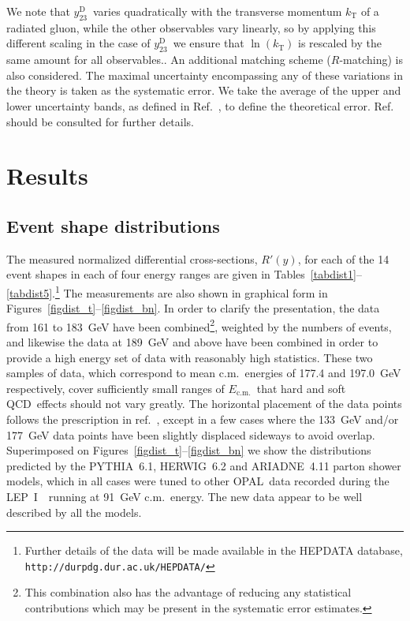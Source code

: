 \documentclass[12pt,a4paper,twoside]{article}
\newcommand{\ecm}   {\ensuremath{E_{\mathrm{c.m.}}}}
\newcommand{\ytwothree}   {\ensuremath{y^{\mathrm{D}}_{23}}}
\newcommand{\Opal}{\mbox{\rm OPAL}}
\newcommand{\qcd}{\mbox{QCD}}
\newcommand{\Lepone}{\mbox{LEP I }}
\newcommand{\Herwig}{\mbox{HERWIG}}
\newcommand{\Pythia}{\mbox{PYTHIA}}
\newcommand{\Ariadne}{\mbox{ARIADNE}}
\begin{document}
\begin{itemize}
{We note that
\ytwothree\ varies quadratically with the transverse momentum
$k_{\mathrm{T}}$ of a radiated gluon, while the other observables 
vary linearly, so by applying this different scaling 
in the case of \ytwothree\ we ensure that
$\ln(k_{\mathrm{T}})$ is rescaled by the same 
amount for all observables.}.  
An additional
matching scheme ($R$-matching) is also considered.  The maximal uncertainty 
encompassing any of these variations in the theory is taken as the 
systematic error.  We take the average of the upper and lower uncertainty
bands, as defined in Ref.~\cite{LEPQCDWG1}, to define the 
theoretical error.
Ref.~\cite{LEPQCDWG1} should be consulted for 
further details.
\end{itemize}


\section{ Results }
\label{sec_results}
\subsection{ Event shape distributions }
\label{sec_shapes}

The measured normalized differential cross-sections, $R'(y)$, for 
each of the 14 event shapes in 
each of four energy ranges are 
given in Tables~\ref{tabdist1}--\ref{tabdist5}.\footnote{Further details 
of the data will be made available in the HEPDATA database, 
{\tt http://durpdg.dur.ac.uk/HEPDATA/}}  
The measurements are also shown in graphical form in 
Figures~\ref{figdist_t}--\ref{figdist_bn}.
In order to clarify the presentation, 
the data from 161 to 183~GeV have been 
combined\footnote{This combination 
also has the advantage of reducing any statistical contributions which
may be present in the systematic error estimates.}, weighted 
by the numbers of events, and likewise the data at 189~GeV and above have been 
combined in order to provide a 
high energy set of data with reasonably high 
statistics.  These two samples of data, which correspond to mean c.m.\ energies
of 177.4 and 197.0~GeV respectively, cover sufficiently small ranges of \ecm\ that 
hard and soft \qcd\ effects should not vary greatly.
The horizontal placement of the data points follows the prescription 
in ref.~\cite{lafferty-wyatt}, except in a few cases where
the 133~GeV and/or 177~GeV data points have been
slightly displaced sideways to avoid overlap.
Superimposed on Figures~\ref{figdist_t}--\ref{figdist_bn} we show the 
distributions predicted by the \Pythia~6.1, \Herwig~6.2 and \Ariadne~4.11 
parton shower models, which in all cases were tuned to other \Opal\
data recorded during the \Lepone\ running at 91~GeV c.m.\ energy.  
The new data appear to be well described by all the models.
   
\end{document}
